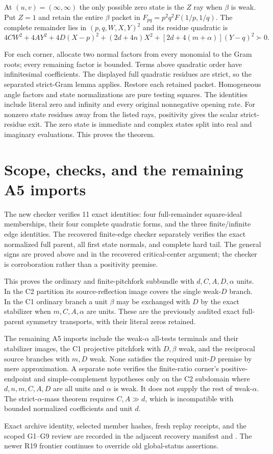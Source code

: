 At $(u,v)=(\infty,\infty)$ the only possible zero state is the $Z$
ray when $\beta$ is weak. Put $Z=1$ and retain the entire $\beta$
packet in $F_{pq}=p^2q^2F(1/p,1/q)$. The complete remainder lies
in $(p,q,W,X,Y)^2$ and its residue quadratic is
\[
 4CW^2+4AY^2+4D(X-p)^2+(2d+4n)X^2
                            +[2d+4(m+\alpha)](Y-q)^2\succ0.
\]

For each corner, allocate two normal factors from every monomial to
the Gram roots; every remaining factor is bounded. Terms above
quadratic order have infinitesimal coefficients. The displayed full
quadratic residues are strict, so the separated strict-Gram lemma
applies. Restore each retained packet. Homogeneous angle factors and
state normalizations are pure testing squares. The identities include
literal zero and infinity and every original nonnegative opening rate.
For nonzero state residues away from the listed rays, positivity gives
the scalar strict-residue exit. The zero state is immediate and complex
states split into real and imaginary evaluations. This proves the theorem.

\section*{Scope, checks, and the remaining A5 imports}

The new checker  verifies 11 exact
identities: four full-remainder square-ideal memberships, their four
complete quadratic forms, and the three finite/infinite edge identities.
The recovered finite-edge checker separately verifies the exact
normalized full parent, all first state normals, and complete hard tail.
The general signs are proved above and in the recovered critical-center
argument; the checker is corroboration rather than a positivity premise.

This proves the ordinary and finite-pitchfork subbundle with
$d,C,A,D,\alpha$ units. In the C2 partition its source-reflection
image covers the single weak-$D$ branch. In the C1 ordinary branch a
unit $\beta$ may be exchanged with $D$ by the exact stabilizer when
$m,C,A,\alpha$ are units. These are the previously audited exact
full-parent symmetry transports, with their literal zeros retained.

The remaining A5 imports include the weak-$\alpha$ all-tests terminals and
their stabilizer images, the C1 projective pitchfork with $D,\beta$
weak, and the reciprocal source branches with $m,D$ weak. None satisfies
the required unit-$D$ premise by mere approximation. A separate note
 verifies the finite-ratio corner's
positive-endpoint and simple-complement hypotheses only on the C2
subdomain where $d,n,m,C,A,D$ are all units and $\alpha$ is weak.
It does not supply the rest of weak-$\alpha$.
The strict-$\alpha$-mass theorem requires $C,A\gg d$, which is
incompatible with bounded normalized coefficients and unit $d$.

Exact archive identity, selected member hashes, fresh replay receipts,
and the scoped G1--G9 review are recorded in the adjacent recovery
manifest and . The newer R19 frontier
continues to override old global-status assertions.
